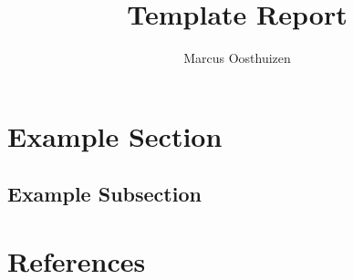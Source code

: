 \documentclass{article}
\author{Marcus Oosthuizen}
\title{Template Report}
\begin{document}
%


\tableofcontents
\clearpage

\section{Example Section}
\subsection{Example Subsection}

\clearpage
\section{References}
\nocite{*}
\printbibliography[heading=none]
\end{document}
